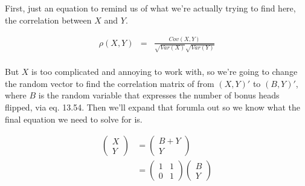 \documentclass[12pt]{article}
\begin{document}
First, just an equation to remind us of what we're actually trying to find here, the correlation between $X$ and $Y$.

\begin{equation*}
	\begin{aligned}
	\rho(X,Y) &=& \frac{Cov(X, Y)}{\sqrt{Var(X)}\sqrt{Var(Y)}} \\
	\end{aligned}
\end{equation*}

But $X$ is too complicated and annoying to work with, so we're going to change the random vector to find the correlation matrix of from $(X,Y)'$ to $(B,Y)'$, where $B$ is the random variable that expresses the number of bonus heads flipped, via eq. 13.54. Then we'll expand that forumla out so we know what the final equation we need to solve for is.

\begin{equation*}
	\begin{aligned}\left(\begin{array}{c}
			X\\
			Y
		\end{array}\right) & = \left(\begin{array}{c}
			B+Y\\
			Y
		\end{array}\right)\\
 		& = \left(\begin{array}{cc}
			1 & 1\\
			0 & 1
		\end{array}\right)\left(\begin{array}{c}
			B\\
			Y
		\end{array}\right)
	\end{aligned}
\end{equation*}
\end{document}
